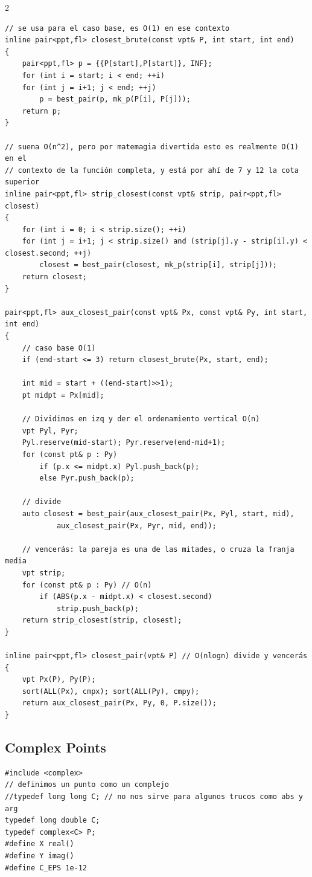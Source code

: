 \documentclass[twoside]{article}
\begin{document}
\begin{multicols*}{2}
\begin{verbatim}
// se usa para el caso base, es O(1) en ese contexto
inline pair<ppt,fl> closest_brute(const vpt& P, int start, int end)
{
    pair<ppt,fl> p = {{P[start],P[start]}, INF};
    for (int i = start; i < end; ++i)
    for (int j = i+1; j < end; ++j)
        p = best_pair(p, mk_p(P[i], P[j]));
    return p;
}

// suena O(n^2), pero por matemagia divertida esto es realmente O(1) en el
// contexto de la función completa, y está por ahí de 7 y 12 la cota superior
inline pair<ppt,fl> strip_closest(const vpt& strip, pair<ppt,fl> closest)
{
    for (int i = 0; i < strip.size(); ++i)
    for (int j = i+1; j < strip.size() and (strip[j].y - strip[i].y) < closest.second; ++j)
        closest = best_pair(closest, mk_p(strip[i], strip[j]));
    return closest;
}

pair<ppt,fl> aux_closest_pair(const vpt& Px, const vpt& Py, int start, int end)
{
    // caso base O(1)
    if (end-start <= 3) return closest_brute(Px, start, end);

    int mid = start + ((end-start)>>1);
    pt midpt = Px[mid];

    // Dividimos en izq y der el ordenamiento vertical O(n)
    vpt Pyl, Pyr;
    Pyl.reserve(mid-start); Pyr.reserve(end-mid+1);
    for (const pt& p : Py)
        if (p.x <= midpt.x) Pyl.push_back(p);
        else Pyr.push_back(p);

    // divide
    auto closest = best_pair(aux_closest_pair(Px, Pyl, start, mid),
            aux_closest_pair(Px, Pyr, mid, end));

    // vencerás: la pareja es una de las mitades, o cruza la franja media
    vpt strip;
    for (const pt& p : Py) // O(n)
        if (ABS(p.x - midpt.x) < closest.second)
            strip.push_back(p);
    return strip_closest(strip, closest);
}

inline pair<ppt,fl> closest_pair(vpt& P) // O(nlogn) divide y vencerás
{
    vpt Px(P), Py(P);
    sort(ALL(Px), cmpx); sort(ALL(Py), cmpy);
    return aux_closest_pair(Px, Py, 0, P.size());
}

\end{verbatim}

	{
		\subsection*{Complex Points}
	}
	\begin{verbatim}
#include <complex>
// definimos un punto como un complejo
//typedef long long C; // no nos sirve para algunos trucos como abs y arg
typedef long double C;
typedef complex<C> P;
#define X real()
#define Y imag()
#define C_EPS 1e-12


\end{verbatim}
\end{multicols*}
\end{document}
